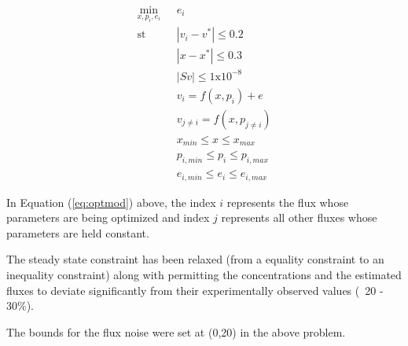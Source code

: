 \documentclass[10pt]{report}
\begin{document}
	\begin{center}
		\begin{subequations}\label{eq:optmod}
			\begin{align}
			\underset{x,p_i,e_i}{\mathrm{min}} & \text{      }e_i\\
			\mathrm{st} & \text{      }|v_i-v^*| \le 0.2\\
			& \text{      }|x-x^*| \le 0.3\\
			& \text{      }|Sv| \le 1\text{x}10^{-8}\\
			& \text{      }v_i = f(x,p_i) + e\\
			& \text{      }v_{j\not= i} = f(x,p_{j\not=i})\\
			& \text{      }x_{min}\le x \le x_{max}\\
			& \text{      }p_{i,min} \le p_i \le p_{i,max}\\
			& \text{      }e_{i,min} \le e_i \le e_{i,max}					
			\end{align}
		\end{subequations}		
	\end{center}
	
	In Equation (\ref{eq:optmod}) above, the index $i$ represents the flux whose parameters are being optimized and index $j$ represents all other fluxes whose parameters are held constant. 
	
	The steady state constraint has been relaxed (from a equality constraint to an inequality constraint) along with permitting the concentrations and the estimated fluxes to deviate significantly from their experimentally observed values (~20 - 30\%). 
	
	The bounds for the flux noise were set at (0,20) in the above problem.
\end{document}
